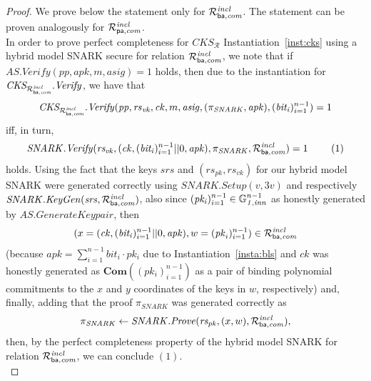 \begin{proof} We prove below the statement only for $\mathcal{R}^{\mathit{incl}}_{\mathsf{ba},\mathit{com}}$. The statement can be proven analogously for $\mathcal{R}^{\mathit{incl}}_{\mathsf{pa},\mathit{com}}$. \\

In order to prove perfect completeness for $\mathit{CKS}_{\mathcal{R}}$ Instantiation~\ref{inst:cks} using a hybrid model SNARK secure for relation 
$\mathcal{R}^{\mathit{incl}}_{\mathsf{ba},\mathit{com}}$, we note that if $\mathit{AS.Verify}(\mathit{pp}, \mathit{apk}, m, \mathit{asig}) = 1$ holds, then due to the instantiation for \\
$\mathit{CKS_{\mathcal{R}^{\mathit{incl}}_{\mathsf{ba},\mathit{com}}}.Verify}$, we have that 
$$\mathit{CKS_{\mathcal{R}^{\mathit{incl}}_{\mathsf{ba},\mathit{com}}}.Verify}(\mathit{pp}, \mathit{rs}_{\mathit{vk}}, \mathit{ck}, m, \mathit{asig}, (\pi_{\mathit{SNARK}}, \mathit{apk}), (\mathit{bit_i})_{i=1}^{n-1}) =1$$ 
iff, in turn, 
$$\mathit{SNARK.Verify}(\mathit{rs_{vk}}, (\mathit{ck}, (\mathit{bit_i})_{i=1}^{n-1} || 0, \mathit{apk}), \pi_{\mathit{SNARK}}, \mathcal{R}^{\mathit{incl}}_{\mathsf{ba},\mathit{com}}) = 1 \ \ \ \ \ \ \ (1)$$ holds. 
Using the fact that the keys $\mathit{srs}$ and $(\mathit{rs}_{\mathit{pk}}, \mathit{rs}_{\mathit{vk}})$ for our hybrid model SNARK were generated correctly using 
$\mathit{SNARK.Setup}(v, 3v)$ and respectively $\mathit{SNARK.KeyGen}(\mathit{srs}, \mathcal{R}^{\mathit{incl}}_{\mathsf{ba},\mathit{com}})$, 
 also since $(\mathit{pk_i})_{i=1}^{n-1} \in \mathbb{G}_{\mathit{1,inn}}^{n-1}$ as honestly generated by $\mathit{AS.GenerateKeypair}$, then 
$$(x = (\mathit{ck}, (\mathit{bit_i})_{i=1}^{n-1}||0, \mathit{apk}), w = (\mathit{pk}_i)_{i=1}^{n-1}) \in \mathcal{R}^{\mathit{incl}}_{\mathsf{ba},\mathit{com}}$$ 
(because $\mathit{apk} = \sum_{i=1}^{n-1} \mathit{bit_i} \cdot \mathit{pk_i}$ due to Instantiation~\ref{insta:bls} and 
$\mathit{ck}$ was honestly generated as  $\mathbf{Com}((\mathit{pk_i})_{i=1}^{n-1})$ as a pair of binding polynomial commitments to the $x$ and $y$ 
coordinates of the keys in $w$, respectively) and, finally, adding that the proof 
$\pi_{\mathit{SNARK}}$ was generated correctly as 
$$ \pi_{\mathit{SNARK}} \leftarrow \mathit{SNARK.Prove}(\mathit{rs_{pk}}, (x,w), \mathcal{R}^{\mathit{incl}}_{\mathsf{ba},\mathit{com}}),$$ 
then, by the perfect completeness property of the hybrid model SNARK for relation $\mathcal{R}^{\mathit{incl}}_{\mathsf{ba},\mathit{com}}$, we can conclude $(1)$.\\


\end{proof}
